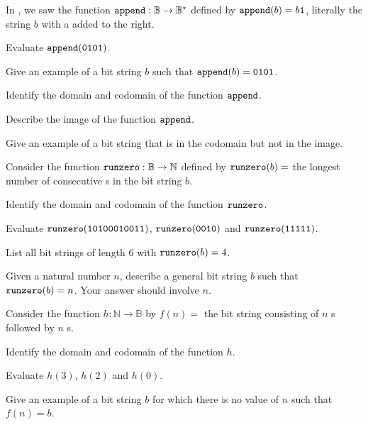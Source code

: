 \begin{exer} [\exerP] %
\label{exer_appendbit_function}
    In , we saw the function $\texttt{append}: \mathbb{B}\to \mathbb{B}^*$ defined by $\texttt{append}(b)=b\texttt{1}$, literally the string $b$ with a  added to the right.
        \begin{exerpart}
            \item Evaluate $\texttt{append}(\texttt{0101}).$
            \item Give an example of a bit string $b$ such that $\texttt{append}(b)= \texttt{0101}$.
            \item Identify the domain and codomain of the function $\texttt{append}$.
            \item Describe the image of the function $\texttt{append}$. 
            \item Give an example of a bit string that is in the codomain but not in the image.   
        \end{exerpart}
\end{exer}

\begin{exer}[\exerU] %
\label{exer_runzero}
    Consider the function $\texttt{runzero}: \mathbb{B} \to \mathbb{N}$ defined by $\texttt{runzero}(b) =$ the longest number of consecutive s in the bit string $b$.
        \begin{exerpart}
             \item Identify the domain and codomain of the function $\texttt{runzero}$.
             \item Evaluate $\texttt{runzero}(\texttt{10100010011})$, $\texttt{runzero}(\texttt{0010})$ and $\texttt{runzero}(\texttt{11111})$.  
             \item List all bit strings of length 6 with $\texttt{runzero}(b) = 4$.
             \item Given a natural number $n$, describe a general bit string $b$ such that $\texttt{runzero}(b) = n$.  Your answer should involve $n$.
        \end{exerpart}
\end{exer}

\begin{exer}[\exerU] %
\label{exer_function_builds_bit_string}
    Consider the function $h: \mathbb{N} \to \mathbb{B}$ by $f(n)=$ the bit string consisting of $n$ s followed by $n$ s. 
        \begin{exerpart}
            \item Identify the domain and codomain of the function $h$.
            \item Evaluate $h(3)$, $h(2)$ and $h(0)$.
            \item Give an example of a bit string $b$ for which there is no value of $n$ such that $f(n)=b$.         
        \end{exerpart}
\end{exer}

